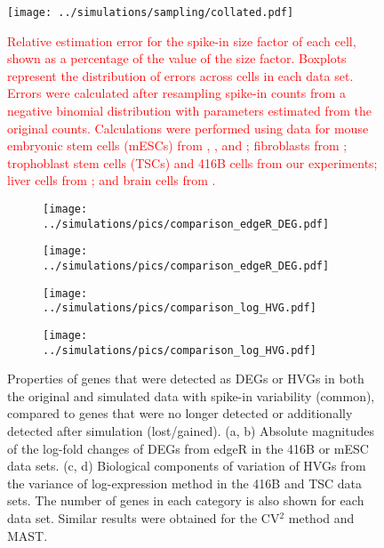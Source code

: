 \documentclass{article}
\newcommand\revised[1]{\textcolor{red}{#1}}
\begin{document}
\begin{figure}
    \begin{center}
        \texttt{[image: ../simulations/sampling/collated.pdf]}
    \end{center}
    \caption{\revised{Relative estimation error for the spike-in size factor of each cell, shown as a percentage of the value of the size factor.
        Boxplots represent the distribution of errors across cells in each data set.
        Errors were calculated after resampling spike-in counts from a negative binomial distribution with parameters estimated from the original counts.
        Calculations were performed using data for mouse embryonic stem cells (mESCs) from \cite{islam2014quantitative},
        \cite{buettner2015computational}, \cite{grun2014validation} and \cite{kolod2015single};  
        fibroblasts from \cite{hashimshony2016celseq2};
        trophoblast stem cells (TSCs) and 416B cells from our experiments;
        liver cells from \cite{scialdone2015computational};
        and brain cells from \cite{zeisel2015brain}. }
    }
    \label{fig:sampling}
\end{figure}

\begin{figure}[btp]
    \begin{center}
        \begin{subfigure}{0.24\textwidth}
            \texttt{[image: ../simulations/pics/comparison\_edgeR\_DEG.pdf]}
            \caption{}
        \end{subfigure}
        \begin{subfigure}{0.24\textwidth}
            \texttt{[image: ../simulations/pics/comparison\_edgeR\_DEG.pdf]}
            \caption{}
        \end{subfigure}
        \begin{subfigure}{0.24\textwidth}
            \texttt{[image: ../simulations/pics/comparison\_log\_HVG.pdf]}
            \caption{}
        \end{subfigure}
        \begin{subfigure}{0.24\textwidth}
            \texttt{[image: ../simulations/pics/comparison\_log\_HVG.pdf]}
            \caption{}
        \end{subfigure}
    \end{center}
    \caption{Properties of genes that were detected as DEGs or HVGs in both the original and simulated data with spike-in variability (common), compared to genes that were no longer detected or additionally detected after simulation (lost/gained).
    (a, b) Absolute magnitudes of the log-fold changes of DEGs from edgeR in the 416B or mESC data sets.
    (c, d) Biological components of variation of HVGs from the variance of log-expression method in the 416B and TSC data sets.
    The number of genes in each category is also shown for each data set.
    Similar results were obtained for the CV$^2$ method and MAST.
    }
\end{figure}
\end{document}

